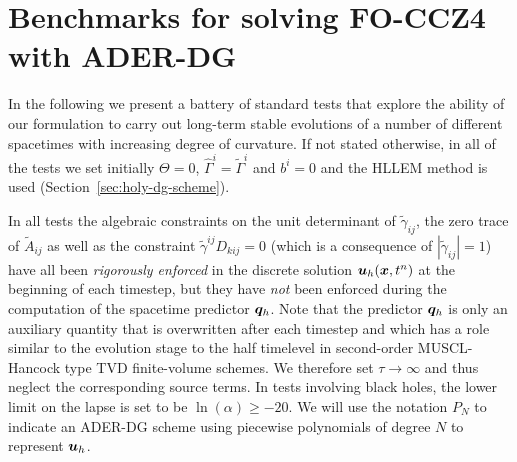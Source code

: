 \section{Benchmarks for solving FO-CCZ4 with ADER-DG}
%
\label{sec.tests}

In the following we present a battery of standard tests that explore the
ability of our formulation to carry out long-term stable evolutions of a
number of different spacetimes with increasing degree of curvature. If
not stated otherwise, in all of the tests we set initially $\Theta = 0$,
$\hat{\Gamma}^i = \tilde{\Gamma}^i$ and $b^i = 0$ and the HLLEM method is
used (Section~\ref{sec:holy-dg-scheme}).

In all tests the algebraic constraints on the
unit determinant of $\tilde{\gamma}_{ij}$, the zero trace of
$\tilde{A}_{ij}$ as well as the constraint $\tilde{\gamma}^{ij} D_{kij} =
0$ (which is a consequence of $|\tilde{\gamma}_{ij}|=1$) have all been
\textit{rigorously enforced} in the discrete solution
$\boldsymbol{u}_h(\boldsymbol{x},t^n)$ at the beginning of each timestep, but they
have \textit{not} been enforced during the computation of the spacetime
predictor $\boldsymbol{q}_h$. Note that the predictor $\boldsymbol{q}_h$ is only an auxiliary
quantity that is overwritten after each timestep and which has a role
similar to the evolution stage to the half timelevel in second-order 
MUSCL-Hancock type TVD finite-volume schemes.
We therefore set $\tau \to \infty$ and thus neglect the corresponding
source terms. In tests involving black holes, the lower limit on the
lapse is set to be $\ln(\alpha) \geq -20$. We will use the notation $P_N$
to indicate an ADER-DG scheme using piecewise polynomials of degree $N$
to represent $\boldsymbol{u}_h$.

